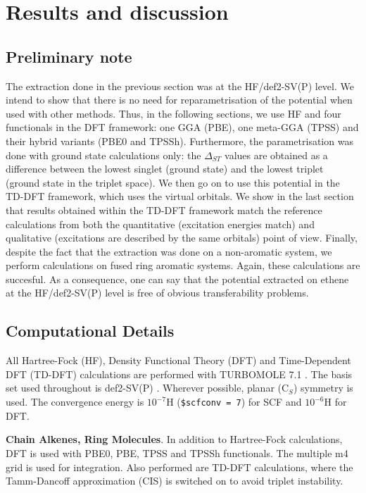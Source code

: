\documentclass[aip,reprint]{revtex4-1}
\begin{document}
\section{Results and discussion}

\subsection{Preliminary note}
The extraction done in the previous section was at the HF/def2-SV(P) level.
We intend to show that there is no need for reparametrisation of the potential
when used with other methods.
Thus, in the following sections, we use HF and four functionals in the DFT framework:
one GGA (PBE), one meta-GGA (TPSS) and their hybrid variants (PBE0 and TPSSh).
Furthermore, the parametrisation was done with ground state calculations only:
the $\Delta_{ST}$ values are obtained as a difference between the lowest singlet (ground state)
and the lowest triplet (ground state in the triplet space).
We then go on to use this potential in the TD-DFT framework, which uses the virtual orbitals.
We show in the last section that results obtained within the TD-DFT framework
match the reference calculations from both the quantitative (excitation energies match)
and qualitative (excitations are described by the same orbitals) point of view.
Finally, despite the fact that the extraction was done on a non-aromatic system,
we perform calculations on fused ring aromatic systems.
Again, these calculations are succesful.
As a consequence, one can say that the potential extracted on ethene at the HF/def2-SV(P)
level is free of obvious transferability problems.

\subsection{Computational Details}
All Hartree-Fock (HF), Density Functional Theory (DFT) and Time-Dependent DFT (TD-DFT) calculations
are performed with TURBOMOLE 7.1 \cite{TURBOMOLE}.
The basis set used throughout is def2-SV(P) \cite{defsvp}.
Wherever possible, planar (C\(_{S}\)) symmetry is used.
The convergence energy is \(10^{-7}\)H (\texttt{\$scfconv = 7}) for SCF and \(10^{-6}\)H for DFT.

\textbf{Chain Alkenes, Ring Molecules}. In addition to Hartree-Fock calculations, DFT is used with PBE0, PBE, TPSS and TPSSh functionals. \cite{pbe0,pbe,tpss,tpssh} The multiple m4 grid is used for integration. Also performed are TD-DFT calculations, where the Tamm-Dancoff approximation (CIS) \cite{tammdancoff} is switched on to avoid triplet instability.
\end{document}
